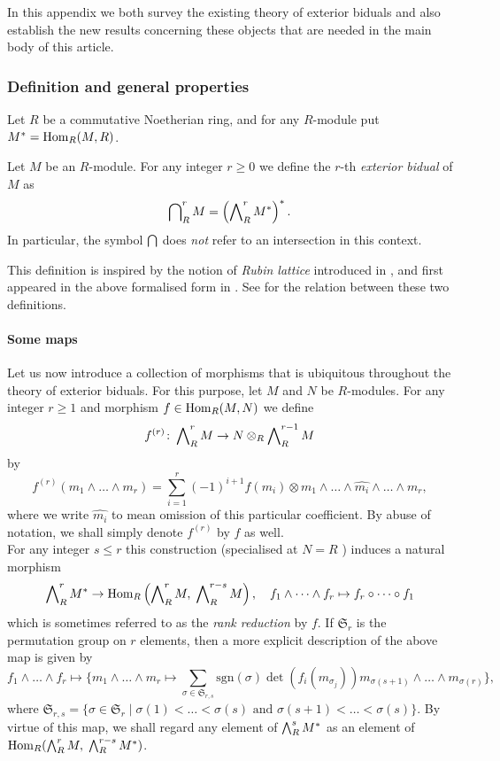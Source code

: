 \documentclass[a4paper, 
headsepline=off, DIV=12, titlepage=false]{scrartcl}
\begin{document}
In this appendix we both survey the existing theory of exterior biduals and also establish the new results concerning these objects that are needed in the main body of this article. 

\tocless\subsubsection{Definition and general properties}


Let $R$ be a commutative Noetherian ring, and for any $R$-module put $M^\ast = \operatorname{Hom}_R (M, R)$. 

\begin{definition}
Let $M$ be an $R$-module. 
For any integer $r \geq 0$ we define the  $r$-th \emph{exterior bidual} of $M$ as
\[
\bigcap\nolimits^r_R M = \left ( \bigwedge\nolimits^r_R M^\ast \right )^\ast.
\]
In particular, the symbol $\bigcap\nolimits$ does \textit{not} refer to an intersection in this context. 
\end{definition}

This definition is inspired by the notion of \textit{Rubin lattice} introduced in \cite{Rubin96}, and first appeared in the above formalised form in \cite{EulerSystemsSagaI}. See \cite[Remark A.9]{EulerSystemsSagaII} for the relation between these two definitions.

\paragraph{Some maps}
Let us now introduce a collection of morphisms that is ubiquitous throughout the theory of exterior biduals. For this purpose, let $M$ and $N$ be $R$-modules. For any integer $r \geq 1$ and morphism $f \in \operatorname{Hom}_R (M, N)$ we define 
\[ 
f^{(r)} \colon \bigwedge\nolimits^r_R M \to N \otimes_R \bigwedge\nolimits^{r - 1}_R M
\]
by
\[
f^{(r)} (m_1 \wedge \dots \wedge m_r) = \sum_{i = 1}^r ( - 1)^{i + 1} f (m_i) \otimes m_1 \wedge \dots \wedge \widehat{m_{i}} \wedge \dots \wedge m_r, 
\]
where we write $\widehat{m_i}$ to mean omission of this particular coefficient. By abuse of notation, we shall simply denote $f^{(r)}$ by $f$ as well. \\

For any integer $s \leq r$ this construction 
(specialised at $N = R$
) 
induces a natural morphism
\[
\bigwedge\nolimits^r_R M^\ast \to \operatorname{Hom}_R \left( \bigwedge\nolimits^r_R M, \; \bigwedge\nolimits^{r - s}_R M\right), \quad
f_1 \wedge \dots \wedge f_r \mapsto f_r \circ \dots \circ f_1
\]
which is sometimes referred to as the \textit{rank reduction} by $f$. 
If $\mathfrak{S}_r$ is the permutation group on $r$ elements, then a more explicit description of the above map is given by 
\begin{equation} \label{ExplicitFormula}
f_1 \wedge \dots \wedge f_r \mapsto 
\bigg \{ m_1 \wedge \dots \wedge m_r \mapsto 
\sum_{\sigma \in \mathfrak{S}_{r,s}} \text{sgn} (\sigma) \det( f_i (m_{\sigma_{j}})) m_{\sigma (s +1)} \wedge \dots \wedge m_{\sigma (r)}
\bigg \},
\end{equation}
where $\mathfrak{S}_{r,s} = \{ \sigma \in \mathfrak{S}_r \mid \sigma (1) < \dots < \sigma (s) \text{ and } \sigma (s + 1) < \dots < \sigma (s) \}$. By virtue of this map, we shall regard any element of $\bigwedge\nolimits^s_R M^\ast$ as an element of $\operatorname{Hom}_R (\bigwedge\nolimits^r_R M, \; \bigwedge\nolimits^{r - s}_R M^\ast)$. 
\end{document}
